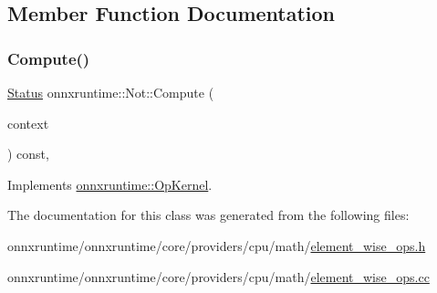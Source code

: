 \subsection{Member Function Documentation}
\mbox{\label{classonnxruntime_1_1Not_a4e471376f21219c6bae5bd1a58dda6cf}} 
\subsubsection{\texorpdfstring{Compute()}{Compute()}}
{\footnotesize\ttfamily \mbox{\hyperlink{classonnxruntime_1_1common_1_1Status}{Status}} onnxruntime\+::\+Not\+::\+Compute (\begin{DoxyParamCaption}\item[{\mbox{\hyperlink{classonnxruntime_1_1OpKernelContext}{Op\+Kernel\+Context}} $\ast$}]{context }\end{DoxyParamCaption}) const\hspace{0.3cm}{\ttfamily [override]}, {\ttfamily [virtual]}}



Implements \mbox{\hyperlink{classonnxruntime_1_1OpKernel_a9eca8656a78b1b3ab9d3351a12798650}{onnxruntime\+::\+Op\+Kernel}}.



The documentation for this class was generated from the following files\+:\begin{DoxyCompactItemize}
\item 
onnxruntime/onnxruntime/core/providers/cpu/math/\mbox{\hyperlink{element__wise__ops_8h}{element\+\_\+wise\+\_\+ops.\+h}}\item 
onnxruntime/onnxruntime/core/providers/cpu/math/\mbox{\hyperlink{element__wise__ops_8cc}{element\+\_\+wise\+\_\+ops.\+cc}}\end{DoxyCompactItemize}
